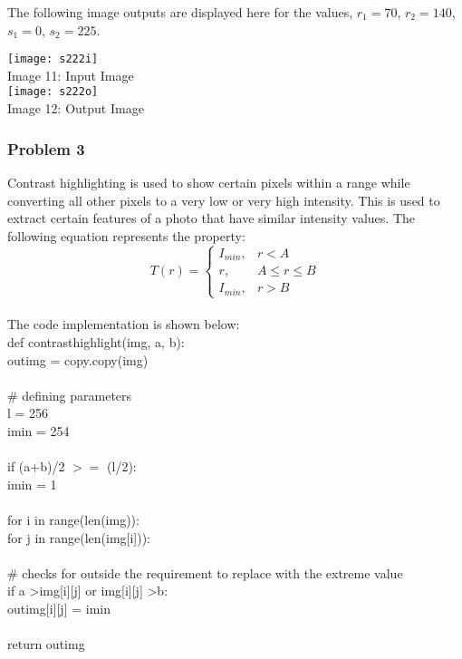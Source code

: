 \documentclass{article}
\begin{document}
	The following image outputs are displayed here for the values, $ r_{1} = 70 $, $ r_{2} = 140$, $ s_{1} = 0$, $ s_{2} = 225$.\\
	
	\begin{center}
		\noindent \texttt{[image: s222i]}\\
		Image 11: Input Image\\
		\texttt{[image: s222o]}\\
		Image 12: Output Image\\
	\end{center}
	
	
	\subsubsection{Problem 3}
	
	Contrast highlighting is used to show certain pixels within a range while converting all other pixels to a very low or very high intensity. This is used to extract certain features of a photo that have similar intensity values. The following equation represents the property:\\
	
	\begin{equation}
	T(r) = \begin{cases} 
	I_{min}, & r < A\\
	r, & A \leq r \leq B\\
	I_{min}, & r > B
	\end{cases} 
	\end{equation}\\
	
	The code implementation is shown below:\\
	
	\noindent def contrast\textunderscore highlight(img, a, b):\\
	\indent out\textunderscore img = copy.copy(img)\\
	\\
	\indent \# defining parameters \\
	\indent l = 256 \\
	\indent i\textunderscore min = 254\\
	\\
	\indent if (a+b)/2 $ >= $ (l/2):\\
	\indent \indent i\textunderscore min = 1\\
	\\
	\indent for i in range(len(img)):\\
	\indent \indent for j in range(len(img[i])):\\
	\\
	\indent \indent \indent \# checks for outside the requirement to replace with the extreme value\\
	\indent \indent \indent if a \textgreater img[i][j] or img[i][j] \textgreater b:\\
	\indent \indent \indent \indent out\textunderscore img[i][j] = i\textunderscore min\\
	\\
	\indent return out\textunderscore img\\
	
\end{document}
